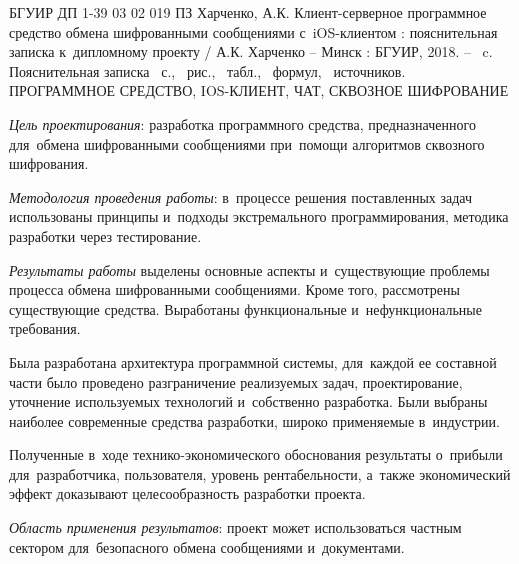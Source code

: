 \thispagestyle{empty}

\setcounter{page}{4}


БГУИР ДП 1-39 03 02 019 ПЗ
\bigbreak
Харченко, А.К. Клиент-серверное программное средство обмена шифрованными сообщениями с~iOS-клиентом : пояснительная записка к~дипломному проекту / А.К. Харченко -- Минск : БГУИР, 2018. -- \totalpages~c.
\bigbreak
Пояснительная записка \totalpages~с., \totfig{}~рис., \tottab{}~табл., \toteq{}~формул, \totref{}~источников.
\bigbreak
\MakeUppercase{Программное средство, iOS-клиент, чат, сквозное шифрование}
\bigbreak

\textit{Цель проектирования}: разработка программного средства, предназначенного для~обмена шифрованными сообщениями при~помощи алгоритмов сквозного шифрования. 

\textit{Методология проведения работы}: в~процессе решения поставленных задач использованы принципы и~подходы экстремального программирования, методика разработки через тестирование.

\textit{Результаты работы} выделены основные аспекты и~существующие проблемы процесса обмена шифрованными сообщениями. Кроме того, рассмотрены существующие средства. Выработаны функциональные и~нефункциональные требования.

Была разработана архитектура программной системы, для~каждой ее составной части было проведено разграничение реализуемых задач, проектирование, уточнение используемых технологий и~собственно разработка. Были выбраны наиболее современные средства разработки, широко применяемые в~индустрии. 

Полученные в~ходе технико-экономического обоснования результаты о~прибыли для~разработчика, пользователя, уровень рентабельности, а~также экономический эффект доказывают целесообразность разработки про\-екта.

\textit{Область применения результатов}: проект может использоваться частным сектором для~безопасного обмена сообщениями и~документами.